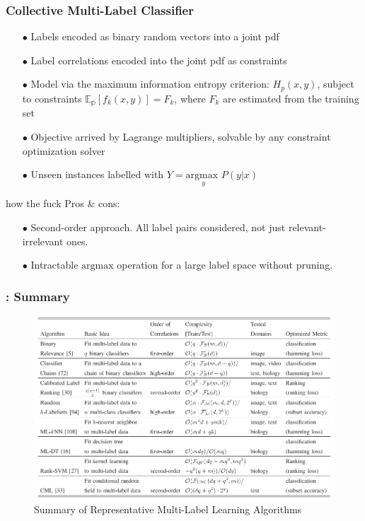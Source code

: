 \documentclass{beamer}
\begin{document}
\begin{frame}
\frametitle{Collective Multi-Label Classifier}
\begin{itemize}
\item[$\bullet$] Labels encoded as binary random vectors into a joint pdf
\item[$\bullet$] Label correlations encoded into the joint pdf as constraints
\item[$\bullet$] Model via the maximum information entropy criterion: $H_p(x, y)$, subject to constraints $\mathbb{E_p}[f_k(x,y)] = F_k$, where $F_k$ are estimated from the training set
\item[$\bullet$] Objective arrived by Lagrange multipliers, solvable by any constraint optimization solver
\item[$\bullet$] Unseen instances labelled with $Y = \underset{y}{\text{argmax }} P(y | x)$
\end{itemize}
how the fuck
Pros \& cons:
\begin{itemize}
\item[$\bullet$] Second-order approach. All label pairs considered, not just relevant-irrelevant ones.
\item[$\bullet$] Intractable $\text{argmax}$ operation for a large label space without pruning.
\end{itemize}
\end{frame}
\begin{frame}
\frametitle{\insertsection : Summary}
\begin{figure}
\begin{center}
\includegraphics[scale = 0.45]{images/summary.png}
\caption{Summary of Representative Multi-Label Learning Algorithms}
\end{center}
\end{figure}
\end{frame}
\end{document}

